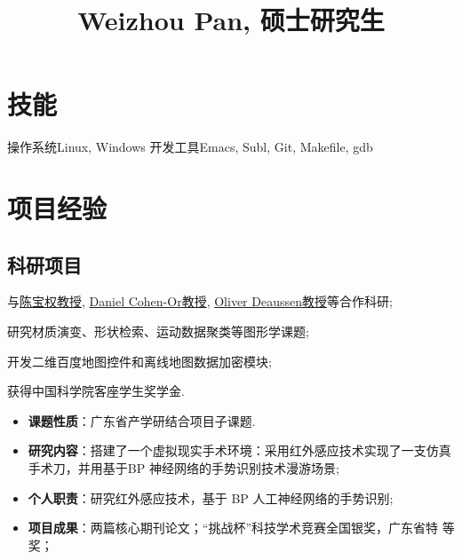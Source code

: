 \documentclass[11pt,a4paper,nolmodern]{moderncv}
\title{Weizhou Pan, 硕士研究生}
\begin{document}
\maketitle

\vspace{-2em}

\section{\hei 技能}

           {操作系统}{Linux, Windows}
           {开发工具}{Emacs, Subl, Git, Makefile, gdb}

\section{\hei 项目经验}


\subsection{\hei 科研项目}

{
  \begin{tightitemize}%
 \item 与\href{http://web.siat.ac.cn/~baoquan/}{陈宝权教授},
   \href{http://www.math.tau.ac.il/~dcor/}{Daniel Cohen-Or教授},
   \href{http://graphics.uni-konstanz.de/mitarbeiter/deussen.php}{Oliver
     Deaussen教授}等合作科研;
 \item 研究材质演变、形状检索、运动数据聚类等图形学课题;
 \item 开发二维百度地图控件和离线地图数据加密模块;
 \item 获得中国科学院客座学生奖学金.
 \end{tightitemize}}

%
  {
\begin{itemize}
 \item \textbf{课题性质}：广东省产学研结合项目子课题.
 \item \textbf{研究内容}：搭建了一个虚拟现实手术环境：采用红外感应技术实现了一支仿真手术刀，并用基于BP
   神经网络的手势识别技术漫游场景;
 \item \textbf{个人职责}：研究红外感应技术，基于 BP 人工神经网络的手势识别;
 \item \textbf{项目成果}：两篇核心期刊论文；“挑战杯”科技学术竞赛全国银奖，广东省特
   等奖；
\end{itemize}}
\end{document}
